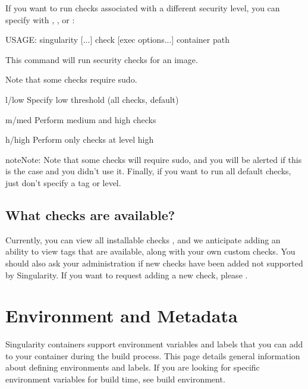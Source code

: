 \documentclass[letterpaper,10pt,english]{sphinxmanual}
\begin{document}
If you want to run checks associated with a different security level,
you can specify with  ,  , or  :

%
\begin{sphinxVerbatim}[commandchars=\\\{\}]
USAGE: singularity [...] check [exec options...] \PYGZlt{}container path\PYGZgt{}

This command will run security checks for an image.

Note that some checks require sudo.


    \PYGZhy{}l/\PYGZhy{}\PYGZhy{}low       Specify low threshold (all checks, default)

    \PYGZhy{}m/\PYGZhy{}\PYGZhy{}med       Perform medium and high checks

    \PYGZhy{}h/\PYGZhy{}\PYGZhy{}high      Perform only checks at level high
\end{sphinxVerbatim}

\begin{sphinxadmonition}{note}{Note:}
Note that some checks will require sudo, and you will be alerted if this
is the case and you didn’t use it. Finally, if you want to run all
default checks, just don’t specify a tag or level.
\end{sphinxadmonition}


\section{What checks are available?}
\label{\detokenize{container_checks:what-checks-are-available}}
Currently, you can view all installable checks
,
and we anticipate adding an ability to view tags that are available,
along with your own custom checks. You should also ask your
administration if new checks have been added not supported by
Singularity. If you want to request adding a new check, please .


\chapter{Environment and Metadata}
\label{\detokenize{environment_and_metadata:environment-and-metadata}}\label{\detokenize{environment_and_metadata:id1}}\label{\detokenize{environment_and_metadata::doc}}\label{\detokenize{environment_and_metadata:sec-envandmetadata}}
Singularity containers support environment variables and labels that you
can add to your container during the build process. This page details
general information about defining environments and labels. If you are looking for specific environment variables for build time, see build
environment.
\end{document}
